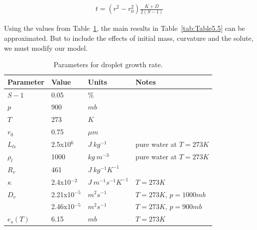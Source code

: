 \documentclass[titlepage]{article}
\begin{document}
\begin{align}
    \label{eq:5.27T}
    t = (r^2 - r_0^2) \frac{K + D}{2(S - 1)}
\end{align}

Using the values from Table~\ref{tab:parameters}, the main results in
Table~\ref{tab:Table5.5} can be approximated. But to include the effects of
initial mass, curvature and the solute, we must modify our model.


\begin{table}[h]
    \centering
    \caption{Parameters for droplet growth rate.}
    \label{tab:parameters}

    \begin{tabular}{l l l l}
    \toprule
    Parameter & Value & Units & Notes\\
    \midrule
    $S - 1$   & 0.05            & \%                         & \\
    $p$       & 900             & $mb$                       & \\
    $T$       & 273             & $K$                        & \\
    $r_0$     & 0.75            & $\mu m$                    & \\
    $L_{lv}$  & 2.5x10$^{6}$    & $J \ kg^{-1}$              & pure water at $T=273 K$ \\
    $\rho_l$  & 1000            & $kg \ m^{-3}$              & pure water at $T=273 K$ \\
    $R_v$     & 461             & $J \ kg^{-1} K^{-1}$       & \\
    $\kappa$  & 2.4x10$^{-2}$   & $J \ m^{-1} s^{-1} K^{-1}$ & $T=273 K$ \\
    $D_v$     & 2.21x10$^{-5}$  & $m^2 s^{-1}$               & $T=273 K$, $p=1000 mb$ \\
              & 2.46x10$^{-5}$  & $m^2 s^{-1}$               & $T=273 K$, $p=900 mb$ \\
    $e_s (T)$ & 6.15            & $mb$                       & $T=273 K$\\
    \bottomrule
    \end{tabular}
\end{table}
\end{document}
